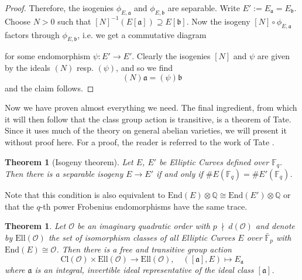\documentclass{ociamthesis}
\newcommand{\Q}{\mathbb{Q}}
\newcommand{\F}{\mathbb{F}}
\newcommand{\End}{\mathrm{End}}
\newcommand{\notdivides}{\ \nmid \ }
\newcommand{\Cl}{\mathrm{Cl}}
\renewcommand{\a}{\mathfrak{a}}
\renewcommand{\b}{\mathfrak{b}}
\newcommand{\Ell}{\mathrm{Ell}}
\renewcommand{\O}{\mathcal{O}}
\newtheorem{theorem}[prop]{Theorem}
\theoremstyle{definition}
\begin{document}
\begin{proof}
    Therefore, the isogenies $\phi_{E, \a}$ and $\phi_{E, \b}$ are separable.
    Write $E' := E_\a = E_\b$.
    Choose $N > 0$ such that $[N]^{-1}(E[\a]) \supseteq E[\b]$.
    Now the isogeny $[N] \circ \phi_{E, \a}$ factors through $\phi_{E, \b}$, i.e. we get a commutative diagram
    \begin{center}
    \end{center}
    for some endomorphism $\psi: E' \to E'$.
    Clearly the isogenies $[N]$ and $\psi$ are given by the ideals $(N)$ resp. $(\psi)$, and so we find
    \begin{equation*}
        (N)\a = (\psi)\b
    \end{equation*}
    and the claim follows.
\end{proof}
Now we have proven almost everything we need.
The final ingredient, from which it will then follow that the class group action is transitive, is a theorem of Tate.
Since it uses much of the theory on general abelian varieties, we will present it without proof here.
For a proof, the reader is referred to the work of Tate \cite{tate}.
\begin{theorem}[Isogeny theorem]
    \label{prop:isogeny_theorem}
    Let $E$, $E'$ be Elliptic Curves defined over $\F_q$.
    Then there is a separable isogeny $E \to E'$ if and only if $\#E(\F_q) = \#E'(\F_q)$.
\end{theorem}
Note that this condition is also equivalent to $\End(E) \otimes \Q \cong \End(E') \otimes \Q$ or that the $q$-th power Frobenius endomorphisms have the same trace. 
\begin{theorem}
    \label{prop:class_group_action}
    Let $\O$ be an imaginary quadratic order with $p \notdivides d(\O)$ and denote by $\Ell(\O)$ the set of isomorphism classes of all Elliptic Curves $E$ over $\bar{\F}_p$ with $\End(E) \cong \O$.
    Then there is a free and transitive group action
    \begin{equation*}
        \Cl(\O) \times \Ell(\O) \to \Ell(\O), \quad ([\a], E) \mapsto E_\a
    \end{equation*}
    where $\a$ is an integral, invertible ideal representative of the ideal class $[\a]$.
\end{theorem}
\end{document}
